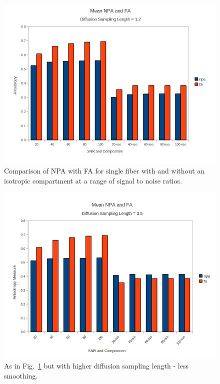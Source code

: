 \documentclass{bioinfo}
\begin{document}
%
\begin{figure}
[th!]

\begin{centering}
\includegraphics[scale=0.7]{figures/NPA_L_Delta1_2}
\par\end{centering}

\caption{Comparison of NPA with FA for single fiber with and without an isotropic
compartment at a range of signal to noise ratios.}


\label{Flo:NPA_1}
\end{figure}


%
\begin{figure}
[th!]

\begin{centering}
\includegraphics[scale=0.7]{figures/NPA_L_Delta3_5}
\par\end{centering}

\caption{As in Fig.~\ref{Flo:NPA_1} but with higher diffusion sampling length
- less smoothing.}


\label{Flo:NPA_2}
\end{figure}
\end{document}

